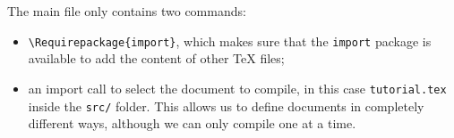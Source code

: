 \noindent The main file only contains two commands:
\begin{itemize}
    \item \texttt{\textbackslash{}Require\Gls{package}\{import\}}, which makes sure that the \texttt{import} \gls{package} is available to add the content of other \TeX{} files;
    \item an import call to select the document to compile, in this case \texttt{tutorial.tex} inside the \texttt{src/} folder. This allows us to define documents in completely different ways, although we can only compile one at a time.
\end{itemize}